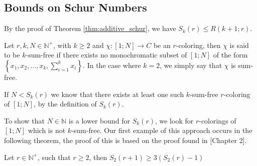 \subsection{Bounds on Schur Numbers}
\begin{remark}\label{rem:initial_bound_on_schur}
	By the proof of Theorem \ref{thm:additive_schur}, we have $S_k(r) \leq R(k + 1; r)$.
\end{remark}
\begin{definition}
	Let $r, k, N \in \mathbb{N}^+$, with $k \geq 2$ and $\chi: [1; N] \to C$ be an $r$-coloring, then $\chi$ is said to be $k$-sum-free if there exists no monochromatic subset of $[1; N]$ of the form $\left\{x_1, x_2, \ldots, x_{k}, \sum_{i = 1}^k x_i\right\}$. In the case where $k = 2$, we simply say that $\chi$ is sum-free.
\end{definition}
\begin{remark}\label{rem:sum_free}
	If $N < S_k(r)$ we know that there exists at least one such $k$-sum-free $r$-coloring of $[1; N]$, by the definition of $S_k(r)$.
\end{remark}
To show that $N \in \mathbb{N}$ is a lower bound for $S_{k}(r)$, we look for $r$-colorings of $[1; N]$ which is not $k$-sum-free. Our first example of this approach occurs in the following theorem, the proof of this is based on the proof found in \cite{emogrt}[Chapter 2].
\begin{theorem}[]
	Let $r \in \mathbb{N}^{+}$, such that $r \geq 2$, then $S_{2}(r + 1) \geq 3(S_2(r) - 1)$
\end{theorem}
